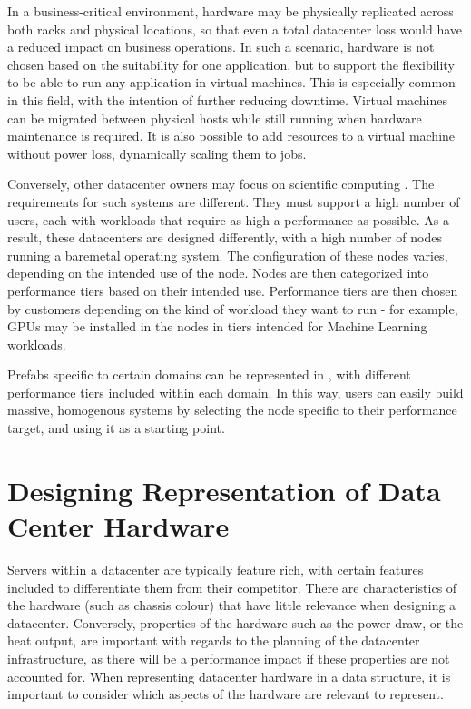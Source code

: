 \documentclass[11pt]{article}
\begin{document}
		In a business-critical environment, hardware may be physically replicated across both racks and physical locations, so that even a total datacenter loss would have a reduced impact on business operations.
		In such a scenario, hardware is not chosen based on the suitability for one application, but to support the flexibility to be able to run any application in virtual machines.
		This is especially common in this field, with the intention of further reducing downtime.
		Virtual machines can be migrated between physical hosts while still running when hardware maintenance is required\cite{Elsaid2016}.
		It is also possible to add resources to a virtual machine without power loss, dynamically scaling them to jobs.

		Conversely, other datacenter owners may focus on scientific computing \cite{SURF2020}.
		The requirements for such systems are different.
		They must support a high number of users, each with workloads that require as high a performance as possible.
		As a result, these datacenters are designed differently, with a high number of nodes running a baremetal operating system.
		The configuration of these nodes varies, depending on the intended use of the node.
		Nodes are then categorized into performance tiers based on their intended use.
		Performance tiers are then chosen by customers depending on the kind of workload they want to run - for example, GPUs may be installed in the nodes in tiers intended for Machine Learning workloads.

		Prefabs specific to certain domains can be represented in \opendc{}, with different performance tiers included within each domain.
		In this way, users can easily build massive, homogenous systems by selecting the node specific to their performance target, and using it as a starting point.

\newpage

\section{Designing Representation of Data Center Hardware} \label{sec:design}
	Servers within a datacenter are typically feature rich, with certain features included to differentiate them from their competitor.
	There are characteristics of the hardware (such as chassis colour) that have little relevance when designing a datacenter.
	Conversely, properties of the hardware such as the power draw, or the heat output, are important with regards to the planning of the datacenter infrastructure, as there will be a performance impact if these properties are not accounted for.
	When representing datacenter hardware in a data structure, it is important to consider which aspects of the hardware are relevant to represent.
	
\end{document}
